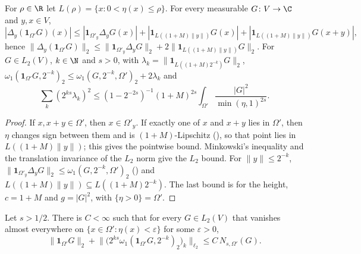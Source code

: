\begin{lemma}
\label{lem:graph-zero-extension-differences}
\leanok
{}
For $\rho \in \R$ let $L(\rho) = \{x : 0 < \eta(x) \leq \rho\}$. For every measurable
$G \colon V \to \C$ and $y, x \in V$,
\[
  |\Delta_y(\mathbf 1_{\Omega'} G)(x)| \leq |\mathbf 1_{\Omega'_y} \Delta_y G(x)|
  + |\mathbf 1_{L((1+M)\|y\|)} G(x)| + |\mathbf 1_{L((1+M)\|y\|)} G(x + y)| ,
\]
hence $\|\Delta_y(\mathbf 1_{\Omega'} G)\|_2 \leq \|\mathbf 1_{\Omega'_y} \Delta_y G\|_2
+ 2 \|\mathbf 1_{L((1+M)\|y\|)} G\|_2$. For $G \in L_2(V)$, $k \in \N$ and $s > 0$, with
$\lambda_k = \|\mathbf 1_{L((1+M) 2^{-k})} G\|_2$,
$\omega_1(\mathbf 1_{\Omega'} G, 2^{-k})_2 \leq \omega_1(G, 2^{-k}, \Omega')_2 + 2 \lambda_k$ and
\[
  \sum_k (2^{ks} \lambda_k)^2 \leq (1 - 2^{-2s})^{-1} (1 + M)^{2s}
  \int_{\Omega'} \frac{|G|^2}{\min(\eta, 1)^{2s}} .
\]
\end{lemma}

\begin{proof}
\leanok
{}
If $x, x + y \in \Omega'$, then $x \in \Omega'_y$. If exactly one of $x$ and $x + y$ lies in
$\Omega'$, then $\eta$ changes sign between them and is $(1 + M)$-Lipschitz
(), so that point lies in $L((1 + M) \|y\|)$; this gives the pointwise
bound. Minkowski's inequality and the translation invariance of the $L_2$ norm give the $L_2$
bound. For $\|y\| \leq 2^{-k}$, $\|\mathbf 1_{\Omega'_y} \Delta_y G\|_2 \leq \omega_1(G, 2^{-k},
\Omega')_2$ () and $L((1 + M) \|y\|) \subseteq L((1 + M) 2^{-k})$. The
last bound is  for the height, $c = 1 + M$ and $g = |G|^2$, with
$\{\eta > 0\} = \Omega'$.
\end{proof}

\begin{theorem}
\label{thm:graph-indicator-hardy}
\leanok
{}
Let $s > 1/2$. There is $C < \infty$ such that for every $G \in L_2(V)$ that vanishes almost
everywhere on $\{x \in \Omega' : \eta(x) < \varepsilon\}$ for some $\varepsilon > 0$,
\[
  \|\mathbf 1_{\Omega'} G\|_2
  + \bigl\|\bigl(2^{ks} \omega_1(\mathbf 1_{\Omega'} G, 2^{-k})_2\bigr)_k\bigr\|_{\ell_2}
  \leq C \, N_{s,\Omega'}(G) .
\]
\end{theorem}

